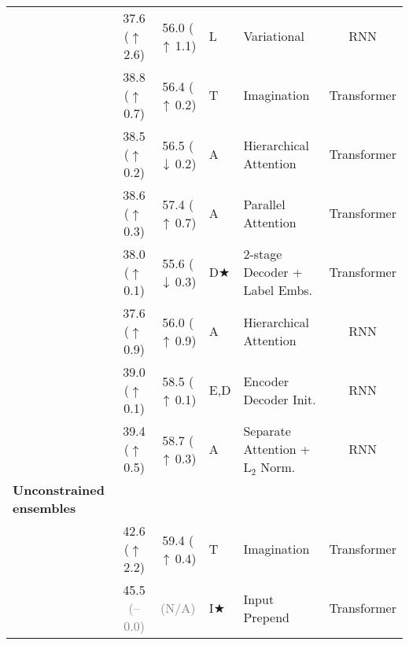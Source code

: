 \documentclass{svjour3}
\newcommand{\uua}[0]{$\uparrow\,$}
\newcommand{\dda}[0]{$\mathbf{\downarrow}\,$}
\newcommand{\sspn}[1]{\textcolor{ssp}{(\uua #1)}}
\newcommand{\ssmn}[1]{\textcolor{ssm}{(\dda #1)}}
\newcommand{\noc}[0]{\textcolor{gray}{(-- 0.0)}}
\newcommand{\na}[0]{\textcolor{gray}{(N/A)}}
\newcommand{\ff}[0]{$\bigstar$}
\begin{document}
\begin{table}[t]
{\begin{tabular}{@{}lccllc@{}}
\citet{calixto-2018-latent}               & 37.6 \sspn{2.6}   & 56.0 \sspn{1.1}   & L    & Variational          & RNN \\
  \citet{helcl-libovick-varis:2018:WMT}     & 38.8 \sspn{0.7}   & 56.4 \sspn{0.2}   & T    & Imagination          & Transformer    \\
  \citet{libovicky-tfatt-2018}              & 38.5 \sspn{0.2}   & 56.5 \ssmn{0.2}   & A    & Hierarchical Attention & Transformer \\
                                            & 38.6 \sspn{0.3}   & 57.4 \sspn{0.7}   & A    & Parallel Attention     & Transformer \\
  \midrule
\citet{ive-etal-2019-distilling}          & 38.0 \sspn{0.1}   & 55.6 \ssmn{0.3}   &D\ff  & 2-stage Decoder + Label Embs.        & Transformer \\
\citet{libovicky-thesis-2019}             & 37.6 \sspn{0.9}   & 56.0 \sspn{0.9}   & A    & Hierarchical Attention  & RNN  \\
\citet{caglayan-thesis-2019}              & 39.0 \sspn{0.1}   & 58.5 \sspn{0.1}   & E,D  & Encoder Decoder Init.   &  RNN \\
                                            & 39.4 \sspn{0.5}   & 58.7 \sspn{0.3}   & A    & Separate Attention + L$_2$ Norm.  & RNN \\
  \midrule
\textbf{Unconstrained ensembles}      \\ \midrule
\citet{helcl-libovick-varis:2018:WMT}     & 42.6 \sspn{2.2}   & 59.4 \sspn{0.4}   & T    & Imagination & Transformer            \\
\citet{gronroos-memad-2018}               & 45.5 \noc         & \na               & I\ff & Input  Prepend & Transformer         \\









































\bottomrule
\end{tabular}}
\end{table}
\end{document}
